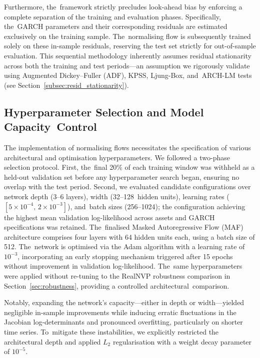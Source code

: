 \documentclass[risks,article,accept,pdftex,moreauthors]{Definitions/mdpi}
\begin{document}
Furthermore, the~framework strictly precludes look-ahead bias by enforcing a complete separation of the training and evaluation phases. Specifically, the~GARCH parameters and their corresponding residuals are estimated exclusively on the training sample. The~normalising flow is subsequently trained solely on these in-sample residuals, reserving the test set strictly for out-of-sample evaluation. This sequential methodology inherently assumes residual stationarity across both the training and test periods—an assumption we rigorously validate using Augmented Dickey--Fuller (ADF), KPSS, Ljung-Box, and~ARCH-LM tests (see Section~\ref{subsec:resid_stationarity}).

\subsection{Hyperparameter Selection and Model Capacity~Control}
\label{subsec:hyperparams}


The implementation of normalising flows necessitates the specification of various architectural and optimisation hyperparameters. We followed a two-phase selection protocol. First, the~final 20\% of each training window was withheld as a held-out validation set before any hyperparameter search began, ensuring no overlap with the test period. Second, we evaluated candidate configurations over network depth (3--6 layers), width (\mbox{32--128 hidden} units), learning rates ($[5 \times 10^{-4},\,2 \times 10^{-3}]$), and~batch sizes (256--1024); the configuration achieving the highest mean validation log-likelihood across assets and GARCH specifications was retained. The~finalised Masked Autoregressive Flow (MAF) architecture comprises four layers with 64 hidden units each, using a batch size of 512. The~network is optimised via the Adam algorithm with a learning rate of $10^{-3}$, incorporating an early stopping mechanism triggered after 15 epochs without improvement in validation log-likelihood. The~same hyperparameters were applied without re-tuning to the RealNVP robustness comparison in Section~\ref{sec:robustness}, providing a controlled architectural~comparison.

Notably, expanding the network's capacity—either in depth or width—yielded negligible in-sample improvements while inducing erratic fluctuations in the Jacobian log-determinants and pronounced overfitting, particularly on shorter time series. To~mitigate these instabilities, we explicitly restricted the architectural depth and applied $L_2$ regularisation with a weight decay parameter of $10^{-5}$. 
\end{document}
